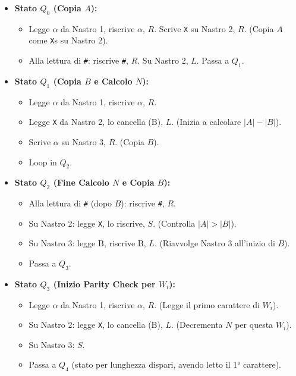 \documentclass[a4paper, 11pt]{book} %
\theoremstyle{definition}
\newcommand{\B}{\text{B}} %
\begin{document}
\begin{itemize}
    \item \textbf{Stato $Q_0$ (Copia $A$):}
        \begin{itemize}
            \item Legge $\alpha$ da Nastro 1, riscrive $\alpha$, $R$. Scrive \texttt{X} su Nastro 2, $R$. (Copia $A$ come \texttt{X}s su Nastro 2).
            \item Alla lettura di \texttt{\#}: riscrive \texttt{\#}, $R$. Su Nastro 2, $L$. Passa a $Q_1$.
        \end{itemize}
    \item \textbf{Stato $Q_1$ (Copia $B$ e Calcolo $N$):}
        \begin{itemize}
            \item Legge $\alpha$ da Nastro 1, riscrive $\alpha$, $R$.
            \item Legge \texttt{X} da Nastro 2, lo cancella ($\B$), $L$. (Inizia a calcolare $|A|-|B|$).
            \item Scrive $\alpha$ su Nastro 3, $R$. (Copia $B$).
            \item Loop in $Q_2$.
        \end{itemize}
    \item \textbf{Stato $Q_2$ (Fine Calcolo $N$ e Copia $B$):}
        \begin{itemize}
            \item Alla lettura di \texttt{\#} (dopo $B$): riscrive \texttt{\#}, $R$.
            \item Su Nastro 2: legge \texttt{X}, lo riscrive, $S$. (Controlla $|A|>|B|$).
            \item Su Nastro 3: legge $\B$, riscrive $\B$, $L$. (Riavvolge Nastro 3 all'inizio di $B$).
            \item Passa a $Q_3$.
        \end{itemize}
    \item \textbf{Stato $Q_3$ (Inizio Parity Check per $W_i$):}
        \begin{itemize}
            \item Legge $\alpha$ da Nastro 1, riscrive $\alpha$, $R$. (Legge il primo carattere di $W_i$).
            \item Su Nastro 2: legge \texttt{X}, lo cancella ($\B$), $L$. (Decrementa $N$ per questa $W_i$).
            \item Su Nastro 3: $S$.
            \item Passa a $Q_4$ (stato per lunghezza dispari, avendo letto il 1° carattere).

\end{itemize}
\end{itemize}
\end{document}
